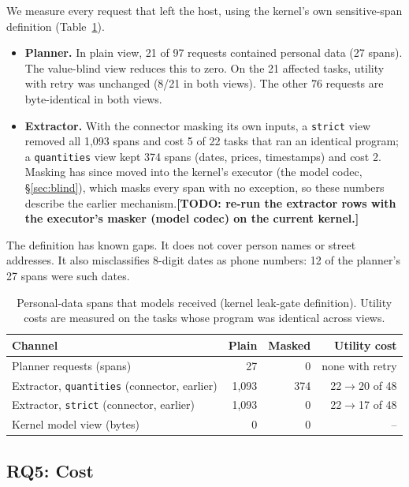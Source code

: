 \documentclass[letterpaper,twocolumn,10pt]{article}
\newcommand{\todo}[1]{{\color{red}\textbf{[TODO: #1]}}}
\begin{document}
We measure every request that left the host, using the kernel's own
sensitive-span definition (Table~\ref{tab:privacy}).
\begin{itemize}
\item \textbf{Planner.} In plain view, 21 of 97 requests contained
  personal data (27 spans). The value-blind view reduces this to zero. On
  the 21 affected tasks, utility with retry was unchanged (8/21 in both
  views). The other 76 requests are byte-identical in both views.
\item \textbf{Extractor.} With the connector masking its own inputs, a
  \texttt{strict} view removed all 1{,}093 spans and cost 5 of 22 tasks
  that ran an identical program; a \texttt{quantities} view kept 374
  spans (dates, prices, timestamps) and cost 2. Masking has since moved
  into the kernel's executor (the model codec, \S\ref{sec:blind}), which
  masks every span with no exception, so these numbers describe the
  earlier mechanism.\todo{re-run the extractor rows with the executor's
  masker (model codec) on the current kernel.}
\end{itemize}
The definition has known gaps. It does not cover person names or street
addresses. It also misclassifies 8-digit dates as phone numbers: 12 of the
planner's 27 spans were such dates.

\begin{table}[t]
\centering\footnotesize
\begin{tabularx}{\columnwidth}{@{}Xrrr@{}}
\toprule
Channel & Plain & Masked & Utility cost\\
\midrule
Planner requests (spans) & 27 & 0 & none with retry\\
Extractor, \texttt{quantities} (connector, earlier) & 1{,}093 & 374 & 22$\rightarrow$20 of 48\\
Extractor, \texttt{strict} (connector, earlier) & 1{,}093 & 0 & 22$\rightarrow$17 of 48\\
Kernel model view (bytes) & 0 & 0 & --\\
\bottomrule
\end{tabularx}
\caption{Personal-data spans that models received (kernel leak-gate
definition). Utility costs are measured on the tasks whose program was
identical across views.}
\label{tab:privacy}
\end{table}

\subsection{RQ5: Cost}
\label{sec:eval-cost}
\end{document}
